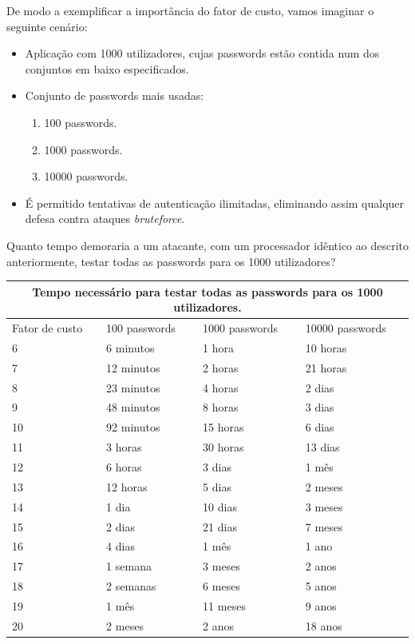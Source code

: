 De modo a exemplificar a importância do fator de custo, vamos imaginar o seguinte cenário:

\begin{itemize}
    \item Aplicação com 1000 utilizadores, cujas passwords estão contida num dos conjuntos em baixo especificados.
    \item Conjunto de passwords mais usadas:
    \begin{enumerate}
        \item 100 passwords.
        \item 1000 passwords.
        \item 10000 passwords.
    \end{enumerate}
    \item É permitido tentativas de autenticação ilimitadas, eliminando assim qualquer defesa contra ataques \emph{bruteforce}.
\end{itemize}

Quanto tempo demoraria a um atacante, com um processador idêntico ao descrito anteriormente, testar todas as passwords para os 1000 utilizadores?

\begin{center}
    \begin{tabular}{ |p{2.5cm}|p{3cm}|p{3cm}|p{3cm}|  }
        \hline
        \multicolumn{4}{|c|}{Tempo necessário para testar todas as passwords para os 1000 utilizadores.} \\
        \hline
        Fator de custo & 100 passwords & 1000 passwords & 10000 passwords\\
        \hline 
        6 & 6 minutos & 1 hora & 10 horas\\
        7 & 12 minutos & 2 horas & 21 horas\\
        8 & 23 minutos & 4 horas & 2 dias\\
        9 & 48 minutos & 8 horas & 3 dias\\
        10 & 92 minutos & 15 horas & 6 dias\\
        11 & 3 horas & 30 horas & 13 dias\\
        12 & 6 horas & 3 dias & 1 mês\\
        13 & 12 horas & 5 dias & 2 meses\\
        14 & 1 dia & 10 dias & 3 meses\\
        15 & 2 dias & 21 dias & 7 meses\\
        16 & 4 dias & 1 mês & 1 ano\\
        17 & 1 semana & 3 meses & 2 anos\\
        18 & 2 semanas & 6 meses & 5 anos\\
        19 & 1 mês & 11 meses & 9 anos\\
        20 & 2 meses & 2 anos & 18 anos\\
        \hline
    \end{tabular}
\label{tab:bcrypt_bruteforce} 
\end{center}

